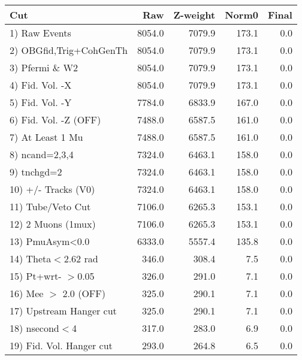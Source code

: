  \begin{table}[h!]\centering
 \begin{tabular}{||l||r|r|r|r||}
 \hline
 \hline
 Cut & Raw & Z-weight & Norm0 & Final \\
 \hline
  1) Raw Events           &      8054.0 &      7079.9 &       173.1 &         0.0 \\
  2) OBGfid,Trig+CohGenTh &      8054.0 &      7079.9 &       173.1 &         0.0 \\
  3) Pfermi \& W2         &      8054.0 &      7079.9 &       173.1 &         0.0 \\
  4) Fid. Vol. -X         &      8054.0 &      7079.9 &       173.1 &         0.0 \\
  5) Fid. Vol. -Y         &      7784.0 &      6833.9 &       167.0 &         0.0 \\
  6) Fid. Vol. -Z (OFF)   &      7488.0 &      6587.5 &       161.0 &         0.0 \\
  7) At Least 1 Mu        &      7488.0 &      6587.5 &       161.0 &         0.0 \\
  8) ncand=2,3,4          &      7324.0 &      6463.1 &       158.0 &         0.0 \\
  9) tnchgd=2             &      7324.0 &      6463.1 &       158.0 &         0.0 \\
 10) +/- Tracks (V0)      &      7324.0 &      6463.1 &       158.0 &         0.0 \\
 11) Tube/Veto Cut        &      7106.0 &      6265.3 &       153.1 &         0.0 \\
 12) 2 Muons (1mux)       &      7106.0 &      6265.3 &       153.1 &         0.0 \\
 13) PmuAsym<0.0          &      6333.0 &      5557.4 &       135.8 &         0.0 \\
 14) Theta$<$2.62 rad     &       346.0 &       308.4 &         7.5 &         0.0 \\
 15) Pt+wrt- $>$0.05      &       326.0 &       291.0 &         7.1 &         0.0 \\
 16) Mee $>$ 2.0  (OFF)   &       325.0 &       290.1 &         7.1 &         0.0 \\
 17) Upstream Hanger cut  &       325.0 &       290.1 &         7.1 &         0.0 \\
 18) nsecond$<$4          &       317.0 &       283.0 &         6.9 &         0.0 \\
 19) Fid. Vol. Hanger cut &       293.0 &       264.8 &         6.5 &         0.0 \\

\end{tabular}
\end{table}
